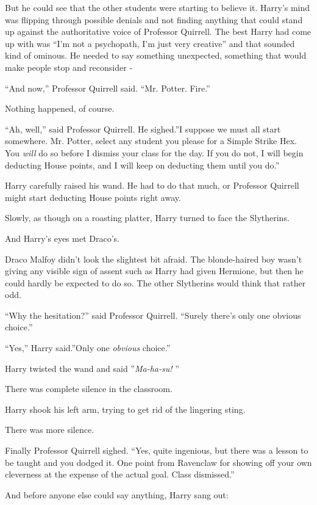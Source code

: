 But he could see that the other students were starting to believe it.
Harry's mind was flipping through possible denials and not finding
anything that could stand up against the authoritative voice of
Professor Quirrell. The best Harry had come up with was ``I'm not a
psychopath, I'm just very creative'' and that sounded kind of ominous.
He needed to say something unexpected, something that would make people
stop and reconsider -

``And now,'' Professor Quirrell said. ``Mr. Potter. Fire.''

Nothing happened, of course.

``Ah, well,'' said Professor Quirrell. He sighed.''I suppose we must all
start somewhere. Mr. Potter, select any student you please for a Simple
Strike Hex. You \emph{will} do so before I dismiss your class for the
day. If you do not, I will begin deducting House points, and I will keep
on deducting them until you do.''

Harry carefully raised his wand. He had to do that much, or Professor
Quirrell might start deducting House points right away.

Slowly, as though on a roasting platter, Harry turned to face the
Slytherins.

And Harry's eyes met Draco's.

Draco Malfoy didn't look the slightest bit afraid. The blonde-haired boy
wasn't giving any visible sign of assent such as Harry had given
Hermione, but then he could hardly be expected to do so. The other
Slytherins would think that rather odd.

``Why the hesitation?'' said Professor Quirrell. ``Surely there's only
one obvious choice.''

``Yes,'' Harry said.''Only one \emph{obvious} choice.''

Harry twisted the wand and said ''\emph{Ma-ha-su!} ''

There was complete silence in the classroom.

Harry shook his left arm, trying to get rid of the lingering sting.

There was more silence.

Finally Professor Quirrell sighed. ``Yes, quite ingenious, but there was
a lesson to be taught and you dodged it. One point from Ravenclaw for
showing off your own cleverness at the expense of the actual goal. Class
dismissed.''

And before anyone else could say anything, Harry sang out:

